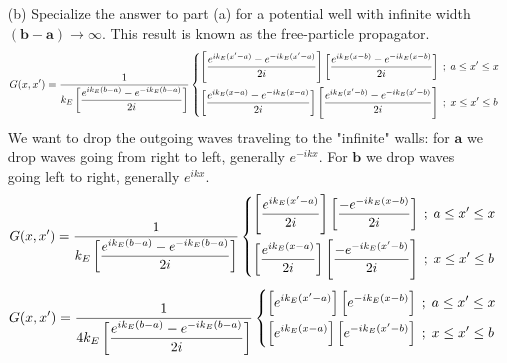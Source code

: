 \documentclass{article}
\begin{document}
{\begin{enumerate}
		\item[(b)] Specialize the answer to part (a) for a potential well with infinite width $\bm{(b - a) \to \infty}$. This result is known as the free-particle propagator.
		\begin{equation*}
			\begin{split}
				G(x,x') = \frac{1}{k_E \left[ \dfrac{e^{ik_E(b - a)} - e^{-ik_E(b - a)}}{2i} \right]}
				&\begin{dcases}
					\left[ \dfrac{e^{ik_E(x' - a)} - e^{-ik_E(x' - a)}}{2i} \right] \left[ \dfrac{e^{ik_E(x - b)}  - e^{-ik_E(x - b)}}{2i} \right] \; ; \; a \leq x' \leq x \\
					\left[ \dfrac{e^{ik_E(x - a)}  - e^{-ik_E(x - a)}}{2i} \right] \left[ \dfrac{e^{ik_E(x' - b)}  - e^{-ik_E(x' - b)}}{2i} \right] \; ; \; x \leq x' \leq b
				\end{dcases}
			\end{split}
		\end{equation*}
		We want to drop the outgoing waves traveling to the "infinite" walls: for $\bm{a}$ we drop waves going from right to left, generally $e^{-ikx}$. For $\bm{b}$ we drop waves going left to right, generally $e^{ikx}$.
		\begin{equation*}
			\begin{split}
				G(x,x') = \frac{1}{k_E \left[ \dfrac{e^{ik_E(b - a)} - e^{-ik_E(b - a)}}{2i} \right]}
				&\begin{dcases}
					\left[ \frac{e^{ik_E(x' - a)}}{2i} \right] \left[ \frac{-e^{-ik_E(x - b)}}{2i} \right] \; ; \; a \leq x' \leq x \\
					\left[ \frac{e^{ik_E(x - a)}}{2i} \right] \left[ \frac{-e^{-ik_E(x' - b)}}{2i} \right] \; ; \; x \leq x' \leq b
				\end{dcases}
			\end{split}
		\end{equation*}
		\begin{equation*}
			\begin{split}
				G(x,x') = \frac{1}{4k_E \left[ \dfrac{e^{ik_E(b - a)} - e^{-ik_E(b - a)}}{2i} \right]}
				&\begin{dcases}
					\left[ e^{ik_E(x' - a)} \right] \left[ e^{-ik_E(x - b)} \right] \; ; \; a \leq x' \leq x \\
					\left[ e^{ik_E(x - a)} \right] \left[ e^{-ik_E(x' - b)} \right] \; ; \; x \leq x' \leq b
				\end{dcases}
			\end{split}
		\end{equation*}

\end{enumerate}}
\end{document}
